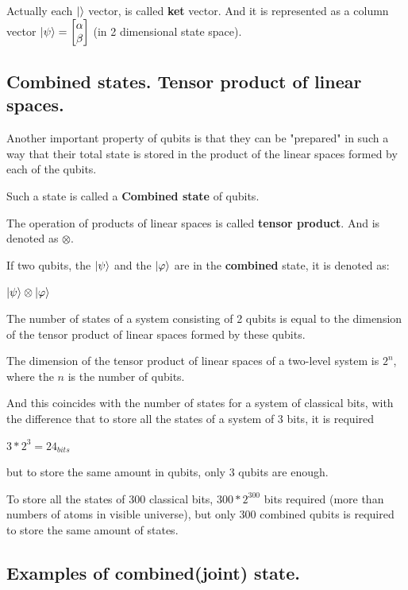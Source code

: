 \documentclass{article}
\begin{document}


Actually each $\ket{}$ vector, is called \textbf{ket} vector.
And it is represented as a column vector $\ket{\psi} = \begin{bmatrix} \alpha \\ \beta \end{bmatrix}$ (in 2 dimensional state space).



\subsection{Combined states. Tensor product of linear spaces.}


Another important property of qubits is that they can be "prepared" in such a way that their total state is stored in the product of the linear spaces formed by each of the qubits.

Such a state is called a \textbf{Combined state} of qubits.


The operation of products of linear spaces is called \textbf{tensor product}. And is denoted as $\otimes$.

If two qubits, the $\ket{\psi}$ and the $\ket{\varphi}$ are in the \textbf{combined} state, it is denoted as:

$\ket{\psi} \otimes \ket{\varphi}$

The number of states of a system consisting of 2 qubits is equal to the dimension of the tensor product of linear spaces formed by these qubits.


The dimension of the tensor product of linear spaces of a two-level system is $2^n$, where the $n$ is the number of qubits.

And this coincides with the number of states for a system of classical bits, with the difference that to store all the states of a system of 3 bits, it is required

$3 * 2^3 = 24_{bits}$

but to store the same amount in qubits, only 3 qubits are enough.

To store all the states of 300 classical bits, $300 * 2^{300}$ bits required (more than numbers of atoms in visible universe),
but only 300 combined qubits is required to store the same amount of states.



\subsection{Examples of combined(joint) state.}
\end{document}
